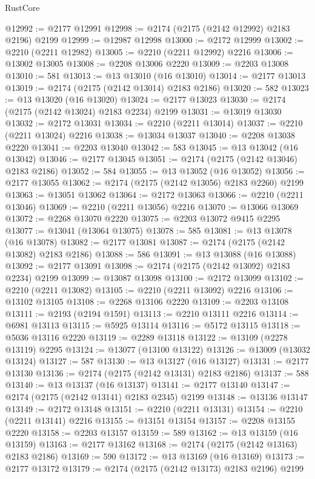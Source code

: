 \begin{lexlean}{RustCore}
\begin{coremodule}
@12992 := @2177 @12991
@12998 := @2174 (@2175 (@2142 @12992) @2183 @2196) @2199
@12999 := @12987 @12998
@13000 := @2172 @12999
@13002 := @2210 (@2211 @12982)
@13005 := @2210 (@2211 @12992) @2216
@13006 := @13002 @13005
@13008 := @2208 @13006 @2220
@13009 := @2203 @13008
@13010 := 581
@13013 := @13 @13010 (@16 @13010)
@13014 := @2177 @13013
@13019 := @2174 (@2175 (@2142 @13014) @2183 @2186)
@13020 := 582
@13023 := @13 @13020 (@16 @13020)
@13024 := @2177 @13023
@13030 := @2174 (@2175 (@2142 @13024) @2183 @2234) @2199
@13031 := @13019 @13030
@13032 := @2172 @13031
@13034 := @2210 (@2211 @13014)
@13037 := @2210 (@2211 @13024) @2216
@13038 := @13034 @13037
@13040 := @2208 @13038 @2220
@13041 := @2203 @13040
@13042 := 583
@13045 := @13 @13042 (@16 @13042)
@13046 := @2177 @13045
@13051 := @2174 (@2175 (@2142 @13046) @2183 @2186)
@13052 := 584
@13055 := @13 @13052 (@16 @13052)
@13056 := @2177 @13055
@13062 := @2174 (@2175 (@2142 @13056) @2183 @2260) @2199
@13063 := @13051 @13062
@13064 := @2172 @13063
@13066 := @2210 (@2211 @13046)
@13069 := @2210 (@2211 @13056) @2216
@13070 := @13066 @13069
@13072 := @2268 @13070 @2220
@13075 := @2203 @13072 @9415 @2295
@13077 := @13041 (@13064 @13075)
@13078 := 585
@13081 := @13 @13078 (@16 @13078)
@13082 := @2177 @13081
@13087 := @2174 (@2175 (@2142 @13082) @2183 @2186)
@13088 := 586
@13091 := @13 @13088 (@16 @13088)
@13092 := @2177 @13091
@13098 := @2174 (@2175 (@2142 @13092) @2183 @2234) @2199
@13099 := @13087 @13098
@13100 := @2172 @13099
@13102 := @2210 (@2211 @13082)
@13105 := @2210 (@2211 @13092) @2216
@13106 := @13102 @13105
@13108 := @2268 @13106 @2220
@13109 := @2203 @13108
@13111 := @2193 (@2194 @1591)
@13113 := @2210 @13111 @2216
@13114 := @6981 @13113
@13115 := @5925 @13114
@13116 := @5172 @13115
@13118 := @5036 @13116 @2220
@13119 := @2289 @13118
@13122 := @13109 (@2278 @13119) @2295
@13124 := @13077 (@13100 @13122)
@13126 := @13009 (@13032 @13124)
@13127 := 587
@13130 := @13 @13127 (@16 @13127)
@13131 := @2177 @13130
@13136 := @2174 (@2175 (@2142 @13131) @2183 @2186)
@13137 := 588
@13140 := @13 @13137 (@16 @13137)
@13141 := @2177 @13140
@13147 := @2174 (@2175 (@2142 @13141) @2183 @2345) @2199
@13148 := @13136 @13147
@13149 := @2172 @13148
@13151 := @2210 (@2211 @13131)
@13154 := @2210 (@2211 @13141) @2216
@13155 := @13151 @13154
@13157 := @2208 @13155 @2220
@13158 := @2203 @13157
@13159 := 589
@13162 := @13 @13159 (@16 @13159)
@13163 := @2177 @13162
@13168 := @2174 (@2175 (@2142 @13163) @2183 @2186)
@13169 := 590
@13172 := @13 @13169 (@16 @13169)
@13173 := @2177 @13172
@13179 := @2174 (@2175 (@2142 @13173) @2183 @2196) @2199

\end{coremodule}
\end{lexlean}
